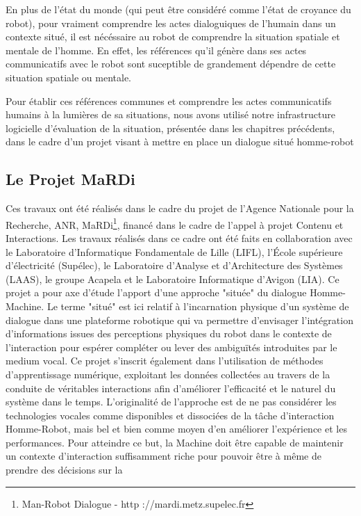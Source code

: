 \documentclass[a4paper,11pt,twoside]{StyleThese}
\begin{document}
En plus de l'état du monde (qui peut être considéré comme l'état de croyance du robot), pour vraiment comprendre les actes dialoguiques de l'humain dans un contexte situé, il est nécéssaire au robot de comprendre la situation spatiale et mentale de l'homme. En effet, les références qu'il génère dans ses actes communicatifs avec le robot sont suceptible de grandement dépendre de cette situation spatiale ou mentale.

Pour établir ces références communes et comprendre les actes communicatifs humains à la lumières de sa situations, nous avons utilisé notre infrastructure logicielle d'évaluation de la situation, présentée dans les chapitres précédents, dans le cadre d'un projet visant à mettre en place un dialogue situé homme-robot


\subsection{Le Projet MaRDi}
Ces travaux ont été réalisés dans le cadre du projet de l’Agence Nationale pour la Recherche,
ANR, MaRDi\footnote{Man-Robot Dialogue - http ://mardi.metz.supelec.fr
}, financé dans le cadre de l’appel à projet Contenu et Interactions. Les
travaux réalisés dans ce cadre ont été faits en collaboration avec le Laboratoire d’Informatique Fondamentale de Lille (LIFL), l’École supérieure d’électricité (Supélec), le Laboratoire d’Analyse et d’Architecture des Systèmes (LAAS), le groupe Acapela et le Laboratoire Informatique d’Avigon (LIA).
Ce projet a pour axe d’étude l’apport d’une approche "située" du dialogue Homme-
Machine. Le terme "situé" est ici relatif à l’incarnation physique d’un système de dialogue dans une plateforme robotique qui va permettre d’envisager l’intégration d’informations issues des perceptions physiques du robot dans le contexte de l’interaction pour espérer compléter ou lever des ambiguïtés introduites par le medium vocal. Ce projet s’inscrit également dans l’utilisation de méthodes d’apprentissage numérique, exploitant les données collectées au travers de la conduite de véritables interactions afin d’améliorer l’efficacité et le naturel du système dans le temps. L’originalité de l’approche est de ne pas considérer les technologies vocales comme disponibles et dissociées de la tâche d’interaction Homme-Robot, mais bel et bien comme moyen d’en améliorer l’expérience et les performances.
Pour atteindre ce but, la Machine doit être capable de maintenir un contexte d’interaction suffisamment riche pour pouvoir être à même de prendre des décisions sur la
\end{document}

